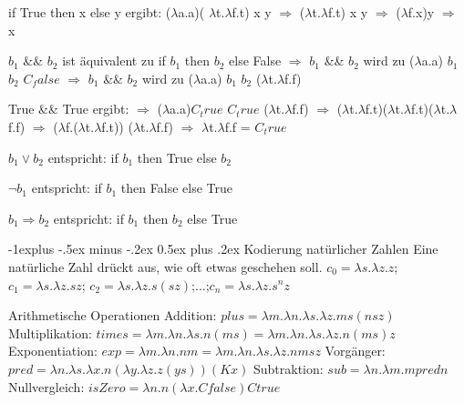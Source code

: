 \documentclass[10pt]{article}
\makeatletter
\renewcommand{\subsection}{\@startsection{subsection}{2}{0mm}%
                                {-1explus -.5ex minus -.2ex}%
                                {0.5ex plus .2ex}%
                                {\normalfont\normalsize\bfseries}}
\makeatother
\begin{document}
\begin{itemize*}
  \item if True then x else y ergibt:
  \subitem ($\lambda$\color{blue}a.a\color{black})(\color{red} $\lambda$t.$\lambda$f.t\color{black}) x y $\Rightarrow$ ($\lambda$\color{blue}t\color{black}.$\lambda$f.\color{blue}t\color{black}) \color{red}x\color{black} y $\Rightarrow$ ($\lambda$\color{blue}f\color{black}.x)\color{red}y\color{black} $\Rightarrow$ x
  \item $b_1$ \&\& $b_2$ ist äquivalent zu if $b_1$ then $b_2$ else False
  \subitem $\Rightarrow$  $b_1$ \&\& $b_2$ wird zu ($\lambda$a.a) $b_1$ $b_2$ $C_false$
  \subitem $\Rightarrow$  $b_1$ \&\& $b_2$ wird zu ($\lambda$a.a) $b_1$ $b_2$ ($\lambda$t.$\lambda$f.f)
  \item True \&\& True ergibt:
  \subitem \color{white} $\Rightarrow$ \color{black}($\lambda$\color{blue}a.a\color{black})\color{red}$C_true$ \color{black} $C_true$ ($\lambda$t.$\lambda$f.f)
  \subitem  $\Rightarrow$ ($\lambda$\color{blue}t\color{black}.$\lambda$f.\color{blue}t\color{black})\color{red}($\lambda$t.$\lambda$f.t)\color{black}($\lambda$t.$\lambda$f.f)
  \subitem $\Rightarrow$ ($\lambda$\color{blue}f\color{black}.($\lambda$t.$\lambda$f.t)) \color{red}($\lambda$t.$\lambda$f.f)\color{black} $\Rightarrow$ $\lambda$t.$\lambda$f.f = $C_true$
\end{itemize*}

\begin{itemize*}
  \item $b_1 \lor b_2$ entspricht:
  \subitem if $b_1$ then True else $b_2$
  \item $\neg b_1$ entspricht:
  \subitem if $b_1$ then False else True
  \item $b_1 \Rightarrow b_2$ entspricht:
  \subitem if $b_1$ then $b_2$ else True
\end{itemize*}

\subsection{Kodierung natürlicher Zahlen}
Eine natürliche Zahl drückt aus, wie oft etwas geschehen soll.
$c_0 = \lambda s.\lambda z.z$; $c_1=\lambda s.\lambda z.sz$; $c_2=\lambda s.\lambda z.s(sz)$;...;$c_n=\lambda s.\lambda z.s^n z$

Arithmetische Operationen
Addition:   $plus = \lambda m. \lambda n. \lambda s. \lambda z. m s (n s z)$
Multiplikation: $times = \lambda m. \lambda n. \lambda s. n (m s) = \lambda m. \lambda n. \lambda s. \lambda z. n (m s) z$
Exponentiation: $exp = \lambda m. \lambda n. n m = \lambda m. \lambda n. \lambda s. \lambda z. n m s z$
Vorgänger:  $pred = \lambda n.\lambda s.\lambda x. n (\lambda y.\lambda z. z (y s))(K x)$
Subtraktion: $sub = \lambda n.\lambda m. m pred n$
Nullvergleich: $isZero = \lambda n. n (\lambda x. C false ) C true$
\end{document}
